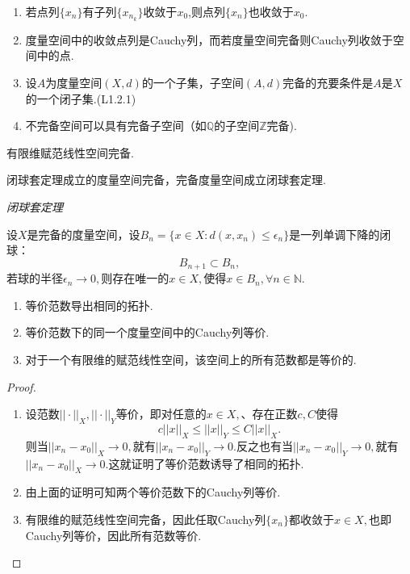 \documentclass[lang=cn,10pt]{elegantbook}
\begin{document}
	\begin{property}
		\begin{enumerate}
			\item 若点列\(\{x_n\}\)有子列\(\{x_{n_k}\}\)收敛于\(x_0\),则点列\(\{x_n\}\)也收敛于\(x_0\).
			\item 度量空间中的收敛点列是Cauchy列，而若度量空间完备则Cauchy列收敛于空间中的点.
			\item 设\(A\)为度量空间\((X,d)\)的一个子集，子空间\((A,d)\)完备的充要条件是\(A\)是\(X\)的一个闭子集.(L1.2.1)
			\item 不完备空间可以具有完备子空间（如\(\mathbb{Q}\)的子空间\(\mathbb{Z}\)完备).
		\end{enumerate}
	\end{property}
	\begin{corollary}[T1.4.2]
		有限维赋范线性空间完备.
	\end{corollary}
	
	\begin{theorem}[闭球套定理和度量空间的完备性等价(T1.4.4,1.4.5)]
		闭球套定理成立的度量空间完备，完备度量空间成立闭球套定理.
		
		\textit{闭球套定理}
		
		设\(X\)是完备的度量空间，设\(B_n=\{x\in X:d(x,x_n) \le \epsilon_n\}\)是一列单调下降的闭球：
		\[B_{n+1} \subset B_n,\]
		若球的半径\(\epsilon_n \to 0,\)则存在唯一的\(x\in X,\)使得\(x\in B_n,\forall n\in \mathbb{N}.\)
	\end{theorem}
	\begin{corollary}
		\begin{enumerate}
			\item 等价范数导出相同的拓扑.
			\item 等价范数下的同一个度量空间中的Cauchy列等价.
			\item 对于一个有限维的赋范线性空间，该空间上的所有范数都是等价的.
		\end{enumerate}
	\end{corollary}
	\begin{proof}
		\begin{enumerate}
			\item 设范数\(||\cdot||_X,||\cdot||_Y\)等价，即对任意的\(x\in X,\)、存在正数\(c,C\)使得
			\[c||x||_X\le ||x||_Y\le C||x||_X.\]
			则当\(||x_n-x_0||_X\to 0,\)就有\(||x_n-x_0||_Y\to 0.\)反之也有当\(||x_n-x_0||_Y\to 0,\)就有\(||x_n-x_0||_X\to 0.\)这就证明了等价范数诱导了相同的拓扑.
			\item 由上面的证明可知两个等价范数下的Cauchy列等价.
			\item 有限维的赋范线性空间完备，因此任取Cauchy列\(\{x_n\}\)都收敛于\(x\in X,\)也即Cauchy列等价，因此所有范数等价.
		\end{enumerate}
	\end{proof}
	
\end{document}
